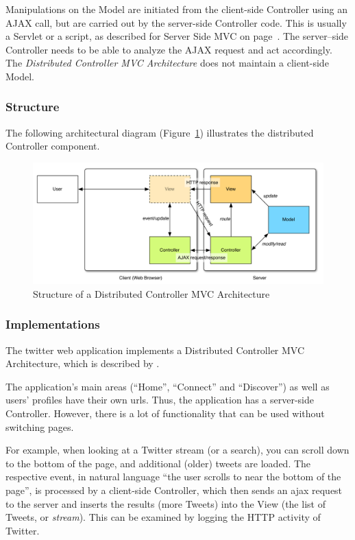 Manipulations on the Model are initiated from the client-side Controller using an AJAX call, but are carried out by the server-side Controller code. This is usually a Servlet or a script, as described for Server Side MVC on page~\pageref{sec:thinclientmvc}. The server--side Controller needs to be able to analyze the AJAX request and act accordingly. The \emph{Distributed Controller MVC Architecture} does not maintain a client-side Model.

\subsubsection{Structure}
The following architectural diagram (Figure~\ref{fig:distcontr}) illustrates the distributed Controller component.
\begin{figure}[H]
	\centering
	\includegraphics[width=16cm]{images/distcontrollermvc.pdf}
	\caption{Structure of a Distributed Controller MVC Architecture}
	\label{fig:distcontr}
\end{figure}

\subsubsection{Implementations}
The \gls{twitter} web application implements a Distributed Controller MVC Architecture, which is described by .

The application's main areas (``Home'', ``Connect'' and ``Discover'') as well as users' profiles have their own \acp{url}. Thus, the application has a server-side Controller. However, there is a lot of functionality that can be used without switching pages.

For example, when looking at a Twitter stream (or a search), you can scroll down to the bottom of the page, and additional (older) \glspl{tweet} are loaded. The respective event, in natural language ``the user scrolls to near the bottom of the page'', is processed by a client-side Controller, which then sends an \ac{ajax} request to the server and inserts the results (more Tweets) into the View (the list of Tweets, or \emph{stream}). This can be examined by logging the HTTP activity of Twitter.

